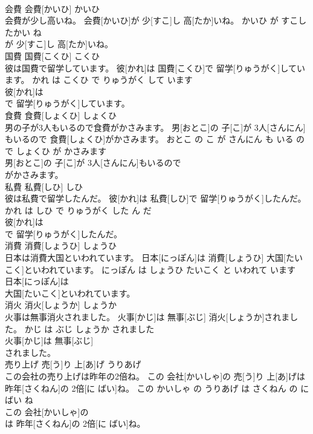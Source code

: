 \documentclass[8pt]{extreport}
\begin{document}
\begin{CJK}{UTF8}{min}
\\	会費	会費[かいひ]	かいひ	
\\	会費が少し高いね。	会費[かいひ]が 少[すこ]し 高[たか]いね。	かいひ が すこし たかい ね	
\\	が 少[すこ]し 高[たか]いね。			
\\	国費	国費[こくひ]	こくひ	
\\	彼は国費で留学しています。	彼[かれ]は 国費[こくひ]で 留学[りゅうがく]しています。	かれ は こくひ で りゅうがく して います	
\\	彼[かれ]は
\\	で 留学[りゅうがく]しています。			
\\	食費	食費[しょくひ]	しょくひ	
\\	男の子が3人もいるので食費がかさみます。	男[おとこ]の 子[こ]が 3人[さんにん]もいるので 食費[しょくひ]がかさみます。	おとこ の こ が さんにん も いる の で しょくひ が かさみます	
\\	男[おとこ]の 子[こ]が 3人[さんにん]もいるので
\\	がかさみます。			
\\	私費	私費[しひ]	しひ	
\\	彼は私費で留学したんだ。	彼[かれ]は 私費[しひ]で 留学[りゅうがく]したんだ。	かれ は しひ で りゅうがく した ん だ	
\\	彼[かれ]は
\\	で 留学[りゅうがく]したんだ。			
\\	消費	消費[しょうひ]	しょうひ	
\\	日本は消費大国といわれています。	日本[にっぽん]は 消費[しょうひ] 大国[たいこく]といわれています。	にっぽん は しょうひ たいこく と いわれて います	
\\	日本[にっぽん]は
\\	大国[たいこく]といわれています。			
\\	消火	消火[しょうか]	しょうか	
\\	火事は無事消火されました。	火事[かじ]は 無事[ぶじ] 消火[しょうか]されました。	かじ は ぶじ しょうか されました	
\\	火事[かじ]は 無事[ぶじ]
\\	されました。			
\\	売り上げ	売[う]り 上[あ]げ	うりあげ	
\\	この会社の売り上げは昨年の2倍ね。	この 会社[かいしゃ]の 売[う]り 上[あ]げは 昨年[さくねん]の 2倍[に ばい]ね。	この かいしゃ の うりあげ は さくねん の に ばい ね	
\\	この 会社[かいしゃ]の
\\	は 昨年[さくねん]の 2倍[に ばい]ね。			

\end{CJK}
\end{document}
